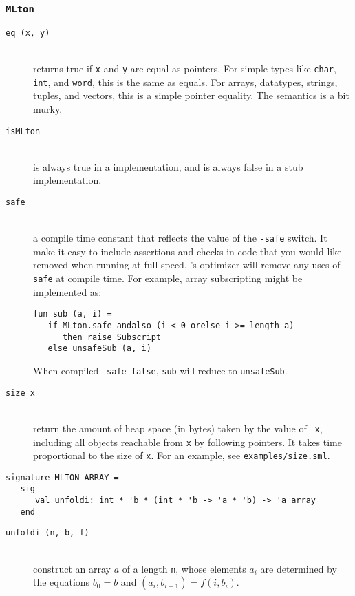 \subsubsection{{\tt MLton}}

\newcommand{\entry}[1]{\item[\tt #1]\hspace{1in}\\}
\begin{description}

\entry{eq (x, y)}
returns true if {\tt x} and {\tt y} are equal as pointers.  For simple
types like {\tt char}, {\tt int}, and {\tt word}, this is the same as
equals.  For arrays, datatypes, strings, tuples, and vectors, this is
a simple pointer equality.  The semantics is a bit murky.

\entry{isMLton}
is always true in a {\mlton} implementation, and is always false in a
stub implementation.

\entry{safe}
a compile time constant that reflects the value of the {\tt -safe}
switch.  It make it easy to include assertions and checks in code that
you would like removed when running at full speed.  {\mlton}'s
optimizer will remove any uses of {\tt safe} at compile time.  For
example, array subscripting might be implemented as:
\begin{verbatim}
fun sub (a, i) =
   if MLton.safe andalso (i < 0 orelse i >= length a)
      then raise Subscript
   else unsafeSub (a, i)
\end{verbatim}
When compiled {\tt -safe false}, {\tt sub} will reduce to
{\tt unsafeSub}.

\entry{size x}
return the amount of heap space (in bytes) taken by the value of {\tt
x}, including all objects reachable from {\tt x} by following
pointers.  It takes time proportional to the size of {\tt x}.  For an
example, see {\tt examples/size.sml}.

\end{description}


\begin{verbatim}
signature MLTON_ARRAY =
   sig
      val unfoldi: int * 'b * (int * 'b -> 'a * 'b) -> 'a array
   end
\end{verbatim}

\begin{description}

\entry{unfoldi (n, b, f)}
construct an array $a$ of a length {\tt n}, whose elements $a_i$ are determined
by the equations $b_0 = b$ and $(a_i, b_{i+1}) = f (i, b_i)$.

\end{description}
%
